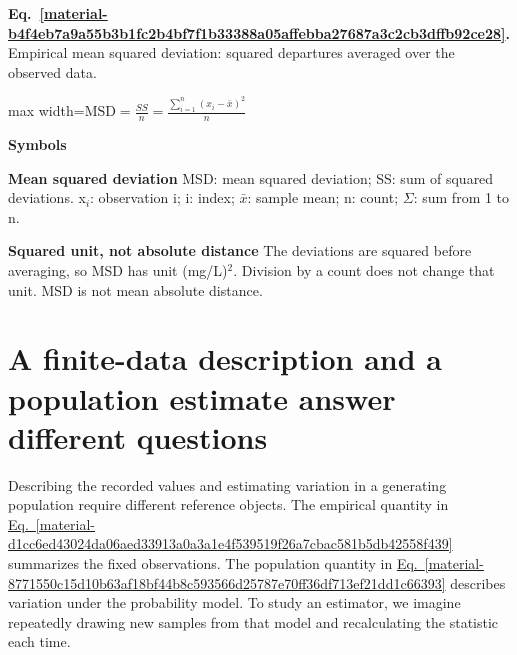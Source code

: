 \documentclass[11pt,a4paper]{article}
\begin{document}
\par\medskip
\begin{samepage}
\label{material-b4f4eb7a9a55b3b1fc2b4bf7f1b33388a05affebba27687a3c2cb3dffb92ce28}
\noindent\textbf{Eq.~\ref*{material-b4f4eb7a9a55b3b1fc2b4bf7f1b33388a05affebba27687a3c2cb3dffb92ce28}.} Empirical mean squared deviation: squared departures averaged over the observed data.\par\nopagebreak
\begin{center}\begin{adjustbox}{max width=\linewidth}$\displaystyle \mathrm{MSD}=\frac{SS}{n}=\frac{\sum_{i=1}^{n}(x_i-\bar{x})^2}{n}$\end{adjustbox}\end{center}

\par\noindent\textbf{Symbols}

\par\noindent\textbf{Mean squared deviation} MSD: mean squared deviation; SS: sum of squared deviations. x\ensuremath{{}_i}: observation i; i: index; \ensuremath{\bar{x}}: sample mean; n: count; \ensuremath{\Sigma}: sum from 1 to n.

\par\noindent\textbf{Squared unit, not absolute distance} The deviations are squared before averaging, so MSD has unit (mg/L)\ensuremath{{}^2}. Division by a count does not change that unit. MSD is not mean absolute distance.

\end{samepage}
\medskip

\clearpage
\section{A finite-data description and a population estimate answer different questions}
Describing the recorded values and estimating variation in a generating population require different reference objects. The empirical quantity in \hyperref[material-d1cc6ed43024da06aed33913a0a3a1e4f539519f26a7cbac581b5db42558f439]{Eq.~\ref*{material-d1cc6ed43024da06aed33913a0a3a1e4f539519f26a7cbac581b5db42558f439}} summarizes the fixed observations. The population quantity in \hyperref[material-8771550c15d10b63af18bf44b8c593566d25787e70ff36df713ef21dd1c66393]{Eq.~\ref*{material-8771550c15d10b63af18bf44b8c593566d25787e70ff36df713ef21dd1c66393}} describes variation under the probability model. To study an estimator, we imagine repeatedly drawing new samples from that model and recalculating the statistic each time.
\end{document}
